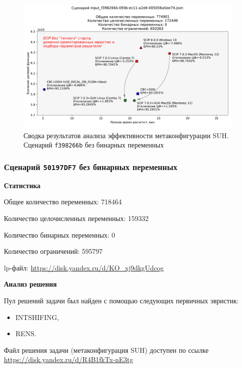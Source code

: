 \documentclass[%
	11pt,
	a4paper,
	utf8,
		]{article}
\begin{document}
\begin{figure}[!h]
	\centering
	\includegraphics[scale=0.6]{figures/summary_f398266b.pdf}
	\caption{Сводка результатов анализа эффективности метаконфигурации SUH. \\Сценарий \texttt{f398266b} без бинарных переменных}\label{fig:summary_f398266b}
\end{figure}


\subsubsection{Сценарий \texttt{50197DF7} без бинарных переменных}

\textbf{Статистика}\vspace*{1mm}

Общее количество переменных: 718464

Количество целочисленных переменных: 159332

Количество бинарных переменных: 0

Количество ограничений: 595797

lp-файл: \url{https://disk.yandex.ru/d/KO_xj9dkgUdcog}

\vspace*{5mm}\textbf{Анализ решения}\vspace*{1mm}

Пул решений задачи был найден с помощью следующих первичных эвристик:
\begin{itemize}
	\item INTSHIFING,
	
	\item RENS.
\end{itemize}

Файл решения задачи (метаконфигурация SUH) доступен по ссылке \url{https://disk.yandex.ru/d/R4B1fkTx-nE3tg}
\end{document}
